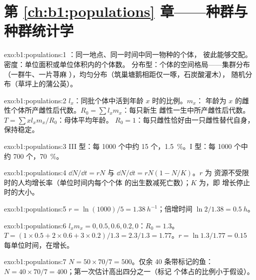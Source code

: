 \section*{第 \ref{ch:b1:populations} 章——种群与种群统计学}

\begin{solution}{exo:b1:populations:1}
：同一地点、同一时间中同一物种的个体，
彼此能够交配。密度：单位面积或单位体积内的个体数。
分布型：个体的空间格局——集群分布（一群牛、一片荨麻
），均匀分布（筑巢塘鹅相距仅一啄，石炭酸灌木），
随机分布（草坪上的蒲公英）。
\end{solution}

\begin{solution}{exo:b1:populations:2}
$l_x$：同批个体中活到年龄 $x$ 时的比例。$m_x$：
年龄为 $x$ 的雌性个体所产雌性后代数。$R_0 = \sum l_x m_x$：每只新生
雌性一生中所产雌性后代数。$T = \sum x l_x m_x / R_0$：母体平均年龄。
$R_0 = 1$：每只雌性恰好由一只雌性替代自身，保持稳定。
\end{solution}

\begin{solution}{exo:b1:populations:3}
III 型：每 1000 个中约 15 个，\qty{1.5}{\%}。I 型：每
1000 个中约 700 个，\qty{70}{\%}。
\end{solution}

\begin{solution}{exo:b1:populations:4}
$\dd N/\dd t = rN$ 与 $\dd N/\dd t = rN(1 - N/K)$。$r$ 为
资源不受限时的人均增长率（单位时间内每个个体
的出生数减死亡数）；$K$ 为，即
增长停止时的大小。
\end{solution}

\begin{solution}{exo:b1:populations:5}
$r = \ln(1000)/5 = \qty{1.38}{h^{-1}}$；倍增时间 $\ln 2/1.38 =
\qty{0.5}{h}$。
\end{solution}

\begin{solution}{exo:b1:populations:6}
$l_x m_x = 0, 0.5, 0.6, 0.2, 0$：$R_0 = 1.3$。$T = (1\times 0.5 +
2\times 0.6 + 3\times 0.2)/1.3 = 2.3/1.3 = 1.77$。$r = \ln 1.3/1.77 =
\qty{0.15}{}$ 每单位时间，在增长。
\end{solution}

\begin{solution}{exo:b1:populations:7}
$N = 50\times 70/7 = 500$。仅余 40 条带标记的鱼：$N = 40\times
70/7 = 400$；第一次估计高出四分之一（标记
个体占的比例小于假设）。
\end{solution}

